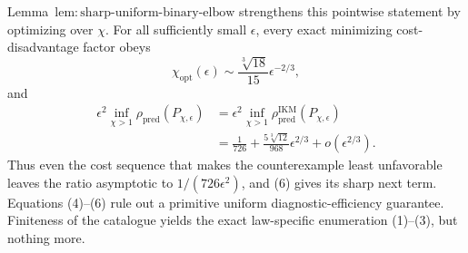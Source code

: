 Lemma~\(\mathrm{lem{:}sharp\text{-}uniform\text{-}binary\text{-}elbow}\) strengthens this pointwise statement by optimizing over \(\chi\). For all sufficiently small \(\epsilon\), every exact minimizing cost-disadvantage factor obeys
\[
 \chi_{\mathrm{opt}}(\epsilon)
 \sim\frac{\sqrt[3]{18}}{15}\epsilon^{-2/3},          \tag{5}
\]
and
\[
\begin{aligned}
 \epsilon^2\inf_{\chi>1}\rho_{\mathrm{pred}}(P_{\chi,\epsilon})
 &=\epsilon^2\inf_{\chi>1}\rho_{\mathrm{pred}}^{\mathrm{IKM}}(P_{\chi,\epsilon})\\
 &=\frac1{726}+\frac{5\sqrt[3]{12}}{968}\epsilon^{2/3}
 +o(\epsilon^{2/3}).                                  \tag{6}
\end{aligned}
\]
Thus even the cost sequence that makes the counterexample least unfavorable leaves the ratio asymptotic to \(1/(726\epsilon^2)\), and (6) gives its sharp next term. Equations (4)--(6) rule out a primitive uniform diagnostic-efficiency guarantee. Finiteness of the catalogue yields the exact law-specific enumeration (1)--(3), but nothing more.